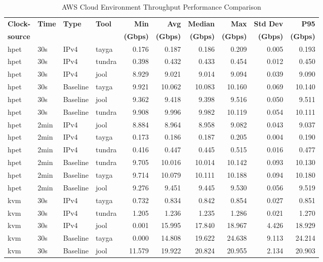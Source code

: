 \begin{table}[htbp]
\centering
\caption{AWS Cloud Environment Throughput Performance Comparison}
\label{tab:throughput_comparison_aws}
\footnotesize
\begin{tabular}{|l|l|l|l|r|r|r|r|r|r|}
\hline
\textbf{Clock-} & \textbf{Time} & \textbf{Type} & \textbf{Tool} & \textbf{Min} & \textbf{Avg} & \textbf{Median} & \textbf{Max} & \textbf{Std Dev} & \textbf{P95} \\
\textbf{source} & & & & \textbf{(Gbps)} & \textbf{(Gbps)} & \textbf{(Gbps)} & \textbf{(Gbps)} & \textbf{(Gbps)} & \textbf{(Gbps)} \\
\hline
hpet & 30s & IPv4 & tayga & 0.176 & 0.187 & 0.186 & 0.209 & 0.005 & 0.193 \\
hpet & 30s & IPv4 & tundra & 0.398 & 0.432 & 0.433 & 0.454 & 0.012 & 0.450 \\
hpet & 30s & IPv4 & jool & 8.929 & 9.021 & 9.014 & 9.094 & 0.039 & 9.090 \\
hpet & 30s & Baseline & tayga & 9.921 & 10.062 & 10.083 & 10.160 & 0.069 & 10.140 \\
hpet & 30s & Baseline & jool & 9.362 & 9.418 & 9.398 & 9.516 & 0.050 & 9.511 \\
hpet & 30s & Baseline & tundra & 9.908 & 9.996 & 9.982 & 10.119 & 0.054 & 10.111 \\
hpet & 2min & IPv4 & jool & 8.884 & 8.964 & 8.958 & 9.082 & 0.043 & 9.037 \\
hpet & 2min & IPv4 & tayga & 0.173 & 0.186 & 0.187 & 0.205 & 0.004 & 0.190 \\
hpet & 2min & IPv4 & tundra & 0.416 & 0.447 & 0.445 & 0.515 & 0.016 & 0.477 \\
hpet & 2min & Baseline & tundra & 9.705 & 10.016 & 10.014 & 10.142 & 0.093 & 10.130 \\
hpet & 2min & Baseline & tayga & 9.714 & 10.079 & 10.111 & 10.188 & 0.094 & 10.180 \\
hpet & 2min & Baseline & jool & 9.276 & 9.451 & 9.445 & 9.530 & 0.056 & 9.519 \\
\hline
kvm & 30s & IPv4 & tayga & 0.732 & 0.834 & 0.842 & 0.854 & 0.027 & 0.851 \\
kvm & 30s & IPv4 & tundra & 1.205 & 1.236 & 1.235 & 1.286 & 0.021 & 1.270 \\
kvm & 30s & IPv4 & jool & 0.001 & 15.995 & 17.840 & 18.967 & 4.426 & 18.929 \\
kvm & 30s & Baseline & tayga & 0.000 & 14.808 & 19.622 & 24.638 & 9.113 & 24.214 \\
kvm & 30s & Baseline & jool & 11.579 & 19.922 & 20.824 & 20.955 & 2.134 & 20.903 \\

\end{tabular}
\end{table}
